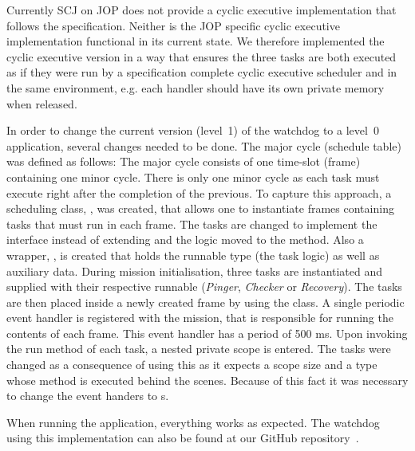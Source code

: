Currently SCJ on JOP does not provide a cyclic executive implementation that follows the specification. Neither is the JOP specific cyclic executive implementation functional in its current state. We therefore implemented the cyclic executive version in a way that ensures the three tasks are both executed as if they were run by a specification complete cyclic executive scheduler and in the same environment, e.g. each handler should have its own private memory when released.

In order to change the current version (level~1) of the watchdog to a level~0 application, several changes needed to be done. The major cycle (schedule table) was defined as follows: The major cycle consists of one time-slot (frame) containing one minor cycle. There is only one minor cycle as each task must execute right after the completion of the previous. To capture this approach, a scheduling class, , was created, that allows one to instantiate frames containing tasks that must run in each frame. The tasks are changed to implement the  interface instead of extending  and the logic moved to the  method. Also a wrapper, , is created that holds the runnable type (the task logic) as well as auxiliary data. During mission initialisation, three tasks are instantiated and supplied with their respective runnable (\textit{Pinger}, \textit{Checker} or \textit{Recovery}). The tasks are then placed inside a newly created frame by using the  class. A single periodic event handler is registered with the mission, that is responsible for running the contents of each frame. This event handler has a period of 500 ms. Upon invoking the run method of each task, a nested private scope is entered. The tasks were changed as a consequence of using this  as it expects a scope size and a  type whose  method is executed behind the scenes. Because of this fact it was necessary to change the event handers to s.

When running the application, everything works as expected. The watchdog using this implementation can also be found at our GitHub repository~\cite{SW902e12:CSPinSCJ}.


